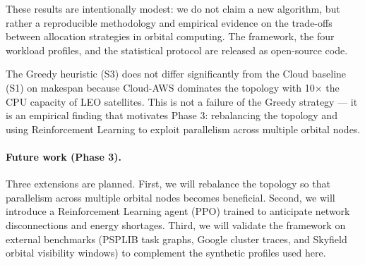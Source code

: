 \documentclass[conference]{IEEEtran}
\begin{document}
These results are intentionally modest: we do not claim a new algorithm, but rather a reproducible methodology and empirical evidence on the trade-offs between allocation strategies in orbital computing. The framework, the four workload profiles, and the statistical protocol are released as open-source code.

The Greedy heuristic (S3) does not differ significantly from the Cloud baseline (S1) on makespan because Cloud-AWS dominates the topology with 10$\times$ the CPU capacity of LEO satellites. This is not a failure of the Greedy strategy --- it is an empirical finding that motivates Phase 3: rebalancing the topology and using Reinforcement Learning to exploit parallelism across multiple orbital nodes.

\paragraph{Future work (Phase 3).}
Three extensions are planned. First, we will rebalance the topology so that parallelism across multiple orbital nodes becomes beneficial. Second, we will introduce a Reinforcement Learning agent (PPO) trained to anticipate network disconnections and energy shortages. Third, we will validate the framework on external benchmarks (PSPLIB task graphs, Google cluster traces, and Skyfield orbital visibility windows) to complement the synthetic profiles used here.



\end{document}
